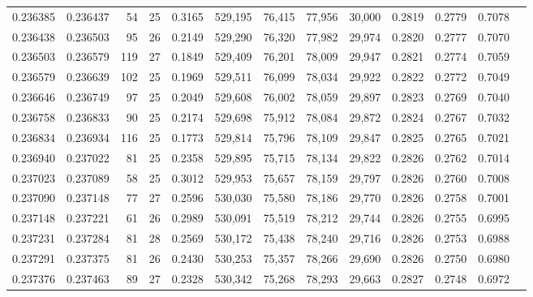 \begin{tabular}{rrrrrrrrrrrrr}
0.236385 & 0.236437 &  54 &  25 &                                     0.3165 & 529,195 &  76,415 &  77,956 &  30,000 & 0.2819 & 0.2779 & 0.7078 \\
0.236438 & 0.236503 &  95 &  26 &                                     0.2149 & 529,290 &  76,320 &  77,982 &  29,974 & 0.2820 & 0.2777 & 0.7070 \\
0.236503 & 0.236579 & 119 &  27 &                                     0.1849 & 529,409 &  76,201 &  78,009 &  29,947 & 0.2821 & 0.2774 & 0.7059 \\
0.236579 & 0.236639 & 102 &  25 &                                     0.1969 & 529,511 &  76,099 &  78,034 &  29,922 & 0.2822 & 0.2772 & 0.7049 \\
0.236646 & 0.236749 &  97 &  25 &                                     0.2049 & 529,608 &  76,002 &  78,059 &  29,897 & 0.2823 & 0.2769 & 0.7040 \\
0.236758 & 0.236833 &  90 &  25 &                                     0.2174 & 529,698 &  75,912 &  78,084 &  29,872 & 0.2824 & 0.2767 & 0.7032 \\
0.236834 & 0.236934 & 116 &  25 &                                     0.1773 & 529,814 &  75,796 &  78,109 &  29,847 & 0.2825 & 0.2765 & 0.7021 \\
0.236940 & 0.237022 &  81 &  25 &                                     0.2358 & 529,895 &  75,715 &  78,134 &  29,822 & 0.2826 & 0.2762 & 0.7014 \\
0.237023 & 0.237089 &  58 &  25 &                                     0.3012 & 529,953 &  75,657 &  78,159 &  29,797 & 0.2826 & 0.2760 & 0.7008 \\
0.237090 & 0.237148 &  77 &  27 &                                     0.2596 & 530,030 &  75,580 &  78,186 &  29,770 & 0.2826 & 0.2758 & 0.7001 \\
0.237148 & 0.237221 &  61 &  26 &                                     0.2989 & 530,091 &  75,519 &  78,212 &  29,744 & 0.2826 & 0.2755 & 0.6995 \\
0.237231 & 0.237284 &  81 &  28 &                                     0.2569 & 530,172 &  75,438 &  78,240 &  29,716 & 0.2826 & 0.2753 & 0.6988 \\
0.237291 & 0.237375 &  81 &  26 &                                     0.2430 & 530,253 &  75,357 &  78,266 &  29,690 & 0.2826 & 0.2750 & 0.6980 \\
0.237376 & 0.237463 &  89 &  27 &                                     0.2328 & 530,342 &  75,268 &  78,293 &  29,663 & 0.2827 & 0.2748 & 0.6972 \\

\end{tabular}

